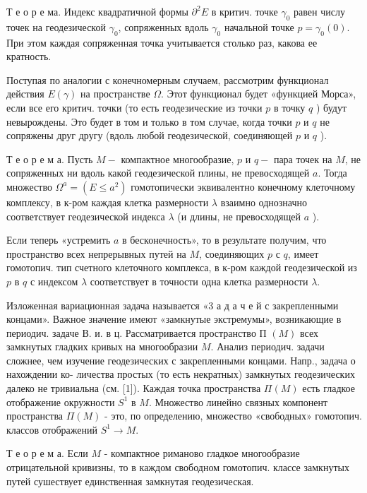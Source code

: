 \documentclass[10pt]{article}
\begin{document}
Т е о р е ма. Индекс квадратичной формы $\partial^{2} E$ в критич. точке $\gamma_{0}$ равен числу точек на геодезической $\gamma_{0}$, сопряженных вдоль $\gamma_{0}$ начальной точке $p=\gamma_{0}(0)$. При этом каждая сопряженная точка учитывается столько раз, какова ее кратность.



Поступая по аналогии с конечномерным случаем, рассмотрим функционал действия $E(\gamma)$ на пространстве $\Omega$. Этот функционал будет «функцией Морса», если все его критич. точки (то есть геодезические из точки $p$ в точку $q$ ) будут невырождены. Это будет в том и только в том случае, когда точки $p$ и $q$ не сопряжены друг другу (вдоль любой геодезической, соединяющей $p$ и $q$ ).



Т е о р е м а. Пусть $M-$ компактное многообразие, $p$ и $q-$ пара точек на $M$, не сопряженных ни вдоль какой геодезической плины, не превосходящей $a$. Тогда множество $\Omega^{a}=\left(E \leqslant a^{2}\right)$ гомотопически эквивалентно конечному клеточному комплексу, в к-ром каждая клетка размерности $\lambda$ взаимно однозначно соответствует геодезической индекса $\lambda$ (и длины, не превосходящей $a$ ).



Если теперь «устремить $a$ в бесконечность», то в результате получим, что пространство всех непрерывных путей на $M$, соединяющих $p$ с $q$, имеет гомотопич. тип счетного клеточного комплекса, в к-ром каждой геодезической из $p$ в $q$ с индексом $\lambda$ соответствует в точности одна клетка размерности $\lambda$.



Изложенная вариационная задача называется «3 а д а ч е й с закрепленными концами». Важное значение имеют «замкнутые экстремумы», возникающие в периодич. задаче В. и. в ц. Рассматривается пространство П $(M)$ всех замкнутых гладких кривых на многообразии $M$. Анализ периодич. задачи сложнее, чем изучение геодезических с закрепленными концами. Напр., задача о нахождении ко- личества простых (то есть некратных) замкнутых геодезических далеко не тривиальна (см. [1]). Каждая точка пространства $\Pi(M)$ есть гладкое отображение окружности $S^{1}$ в $M$. Множество линейно связных компонент пространства $\Pi(M)$ - это, по определению, множество «свободных» гомотопич. классов отображений $S^{1} \rightarrow M$.



Т е о р е м а. Если $M$ - компактное риманово гладкое многообразие отрицательной кривизны, то в каждом свободном гомотопич. классе замкнутых путей сушествует единственная замкнутая геодезическая.
\end{document}
